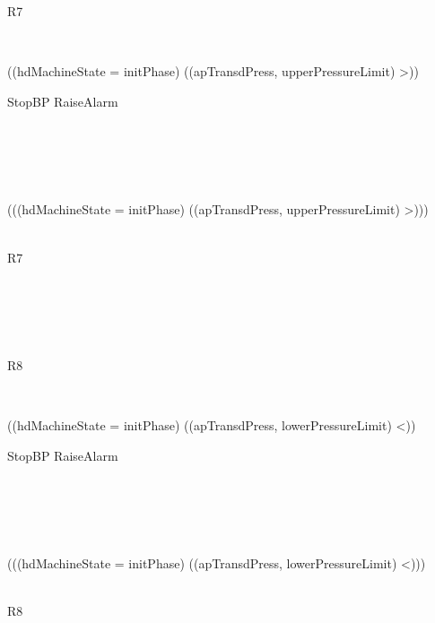 \begin{circus}
\begin{block}
\begin{block}
			\end{block}\\
			
	\end{block}\\
	
	R7 \circdef \\
	\begin{block}
		\\
			\begin{block}
				\lcircguard ((hdMachineState = {initPhase}) \land ((apTransdPress, upperPressureLimit) \in >)) \rcircguard \circguard \\
					\begin{block}
						StopBP \interleave RaiseAlarm
					\end{block}\\
					
			\end{block}\\
			 \extchoice \\
			\begin{block}
				\lcircguard \lnot (((hdMachineState = {initPhase}) \land ((apTransdPress, upperPressureLimit) \in >))) \rcircguard \circguard \\
					\begin{block}
						\Skip\\ \circseq R7
					\end{block}\\
					
			\end{block}\\
			
	\end{block}\\
	
	R8 \circdef \\
	\begin{block}
		\\
			\begin{block}
				\lcircguard ((hdMachineState = {initPhase}) \land ((apTransdPress, lowerPressureLimit) \in <)) \rcircguard \circguard \\
					\begin{block}
						StopBP \interleave RaiseAlarm
					\end{block}\\
					
			\end{block}\\
			 \extchoice \\
			\begin{block}
				\lcircguard \lnot (((hdMachineState = {initPhase}) \land ((apTransdPress, lowerPressureLimit) \in <))) \rcircguard \circguard \\
					\begin{block}
						\Skip\\ \circseq R8
					\end{block}\\
					

\end{block}
\end{block}
\end{circus}
